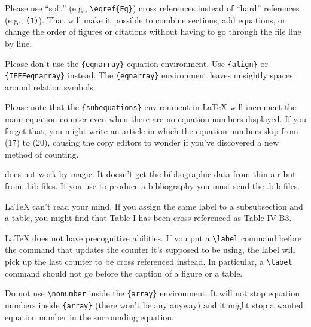 \documentclass[conference]{IEEEtran}
\begin{document}
Please use ``soft'' (e.g., \verb|\eqref{Eq}|) cross references instead
of ``hard'' references (e.g., \verb|(1)|). That will make it possible
to combine sections, add equations, or change the order of figures or
citations without having to go through the file line by line.

Please don't use the \verb|{eqnarray}| equation environment. Use
\verb|{align}| or \verb|{IEEEeqnarray}| instead. The \verb|{eqnarray}|
environment leaves unsightly spaces around relation symbols.

Please note that the \verb|{subequations}| environment in {\LaTeX}
will increment the main equation counter even when there are no
equation numbers displayed. If you forget that, you might write an
article in which the equation numbers skip from (17) to (20), causing
the copy editors to wonder if you've discovered a new method of
counting.

{\BibTeX} does not work by magic. It doesn't get the bibliographic
data from thin air but from .bib files. If you use {\BibTeX} to produce a
bibliography you must send the .bib files. 

{\LaTeX} can't read your mind. If you assign the same label to a
subsubsection and a table, you might find that Table I has been cross
referenced as Table IV-B3. 

{\LaTeX} does not have precognitive abilities. If you put a
\verb|\label| command before the command that updates the counter it's
supposed to be using, the label will pick up the last counter to be
cross referenced instead. In particular, a \verb|\label| command
should not go before the caption of a figure or a table.

Do not use \verb|\nonumber| inside the \verb|{array}| environment. It
will not stop equation numbers inside \verb|{array}| (there won't be
any anyway) and it might stop a wanted equation number in the
surrounding equation.
\end{document}
